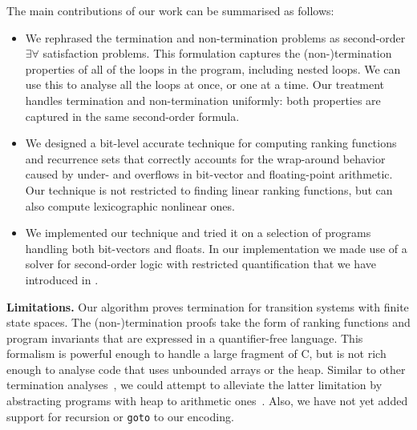 \documentclass[a4paper]{llncs}
\begin{document}
The main contributions of our work can be summarised as follows:
%
\begin{itemize}

\item  We rephrased the termination and non-termination problems as
second-order $\exists \forall$ satisfaction problems.  This formulation
captures the (non-)termination
properties of all of the loops in the program, including
nested loops.  We can use this to analyse all the loops at once,
or one at a time.  Our treatment handles termination and non-termination uniformly:
both properties are captured in the same second-order formula.	

\item We designed a bit-level accurate technique for computing ranking
functions and recurrence sets that correctly accounts for the wrap-around
behavior caused by under- and overflows in bit-vector and floating-point arithmetic.  Our
technique is not restricted to finding linear ranking functions, but can
also compute lexicographic nonlinear ones.







\item We implemented our technique and tried it on a selection of programs
handling both bit-vectors and floats. In our implementation we made use of 
a solver for second-order logic with restricted quantification that we have introduced in \cite{}. 

\end{itemize} 

{\bf Limitations.} Our algorithm proves termination for transition systems
with finite state spaces.  The (non-)termination proofs take the form of
ranking functions and program invariants that are expressed in a
quantifier-free language.  This formalism is powerful enough to handle a
large fragment of C, but is not rich enough to analyse code that uses
unbounded arrays or the heap.  Similar to other termination
analyses~\cite{DBLP:conf/tacas/CookSZ13}, we could attempt to alleviate the
latter limitation by abstracting programs with heap to arithmetic
ones~\cite{DBLP:conf/popl/MagillTLT10}.  Also, we have not yet added support
for recursion or \texttt{goto} to our encoding.
\end{document}
